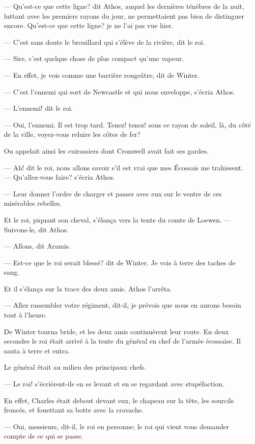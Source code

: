 — Qu'est-ce que cette ligne? dit Athos, auquel les dernières ténèbres de la nuit, luttant avec les premiers rayons du jour, ne permettaient pas bien de distinguer encore. Qu'est-ce que cette ligne? je ne l'ai pas vue hier.

— C'est sans doute le brouillard qui s'élève de la rivière, dit le roi.

— Sire, c'est quelque chose de plus compact qu'une vapeur.

— En effet, je vois comme une barrière rougeâtre, dit de Winter.

— C'est l'ennemi qui sort de Newcastle et qui nous enveloppe, s'écria Athos.

— L'ennemi! dit le roi.

— Oui, l'ennemi. Il est trop tard. Tenez! tenez! sous ce rayon de soleil, là, du côté de la ville, voyez-vous reluire les côtes de fer?

On appelait ainsi les cuirassiers dont Cromwell avait fait ses gardes.

— Ah! dit le roi, nous allons savoir s'il est vrai que mes Écossais me trahissent.
— Qu'allez-vous faire? s'écria Athos.

— Leur donner l'ordre de charger et passer avec eux sur le ventre de ces misérables rebelles.

Et le roi, piquant son cheval, s'élança vers la tente du comte de Loewen.
— Suivons-le, dit Athos.

— Allons, dit Aramis.

— Est-ce que le roi serait blessé? dit de Winter. Je vois à terre des taches de sang.

Et il s'élança sur la trace des deux amis. Athos l'arrêta.

— Allez rassembler votre régiment, dit-il, je prévois que nous en aurons besoin tout à l'heure.

De Winter tourna bride, et les deux amis continuèrent leur route. En deux secondes le roi était arrivé à la tente du général en chef de l'armée écossaise. Il sauta à terre et entra.

Le général était au milieu des principaux chefs.

— Le roi! s'écrièrent-ils en se levant et en se regardant avec stupéfaction.

En effet, Charles était debout devant eux, le chapeau sur la tête, les sourcils froncés, et fouettant sa botte avec la cravache.

— Oui, messieurs, dit-il, le roi en personne; le roi qui vient vous demander compte de ce qui se passe.

